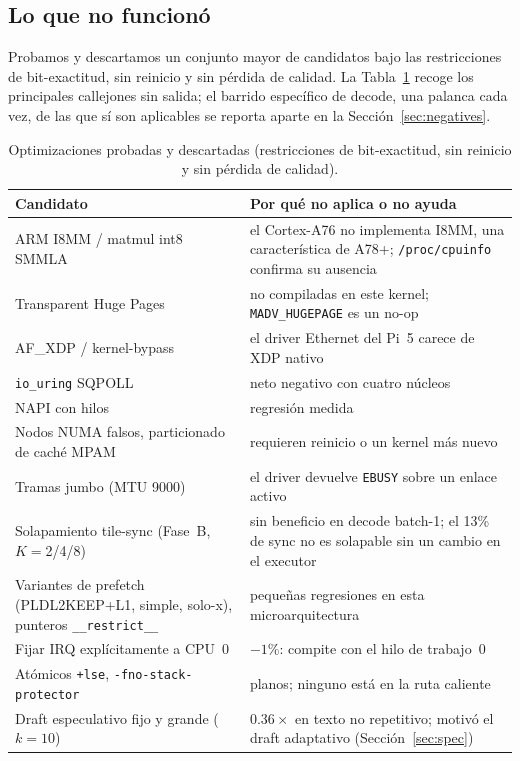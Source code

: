 \documentclass[10pt,a4paper]{article}
\begin{document}
\subsection{Lo que no funcionó}
Probamos y descartamos un conjunto mayor de candidatos bajo las restricciones de bit-exactitud, sin reinicio y sin pérdida de calidad. La Tabla~\ref{tab:deadends} recoge los principales callejones sin salida; el barrido específico de decode, una palanca cada vez, de las que sí son aplicables se reporta aparte en la Sección~\ref{sec:negatives}.

\begin{table}[H]
\centering\small
\caption{Optimizaciones probadas y descartadas (restricciones de bit-exactitud, sin reinicio y sin pérdida de calidad).}
\label{tab:deadends}
\begin{tabularx}{\textwidth}{p{4.6cm}X}
\toprule
\textbf{Candidato} & \textbf{Por qué no aplica o no ayuda} \\
\midrule
ARM I8MM / matmul int8 SMMLA & el Cortex-A76 no implementa I8MM, una característica de A78+; \texttt{/proc/cpuinfo} confirma su ausencia \\
Transparent Huge Pages & no compiladas en este kernel; \texttt{MADV\_HUGEPAGE} es un no-op \\
AF\_XDP / kernel-bypass & el driver Ethernet del Pi~5 carece de XDP nativo \\
\texttt{io\_uring} SQPOLL & neto negativo con cuatro núcleos \\
NAPI con hilos & regresión medida \\
Nodos NUMA falsos, particionado de caché MPAM & requieren reinicio o un kernel más nuevo \\
Tramas jumbo (MTU 9000) & el driver devuelve \texttt{EBUSY} sobre un enlace activo \\
Solapamiento tile-sync (Fase~B, $K{=}$2/4/8) & sin beneficio en decode batch-1; el 13\% de sync no es solapable sin un cambio en el executor \\
Variantes de prefetch (PLDL2KEEP+L1, simple, solo-x), punteros \texttt{\_\_restrict\_\_} & pequeñas regresiones en esta microarquitectura \\
Fijar IRQ explícitamente a CPU~0 & $-1\%$: compite con el hilo de trabajo~0 \\
Atómicos \texttt{+lse}, \texttt{-fno-stack-protector} & planos; ninguno está en la ruta caliente \\
Draft especulativo fijo y grande ($k{=}10$) & $0.36\times$ en texto no repetitivo; motivó el draft adaptativo (Sección~\ref{sec:spec}) \\
\bottomrule
\end{tabularx}
\end{table}
\end{document}
